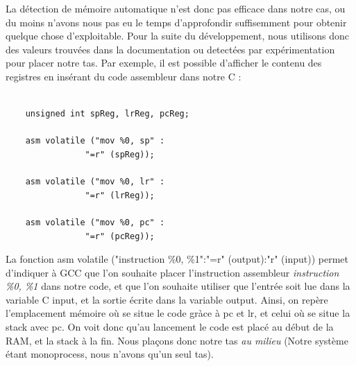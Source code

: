 \documentclass[frenchb]{article}
\begin{document}
La détection de mémoire automatique n'est donc pas efficace dans notre cas, ou du moins n'avons nous pas eu le temps d'approfondir suffisemment pour obtenir quelque chose d'exploitable. Pour la suite du développement, nous utilisons donc des valeurs trouvées dans la documentation ou detectées par expérimentation pour placer notre tas. Par exemple, il est possible d'afficher le contenu des registres en insérant du code assembleur dans notre C :
\begin{lstlisting}

    unsigned int spReg, lrReg, pcReg;

    asm volatile ("mov %0, sp" :
                "=r" (spReg));
    
    asm volatile ("mov %0, lr" :
                "=r" (lrReg));

    asm volatile ("mov %0, pc" :
                "=r" (pcReg));
\end{lstlisting}
La fonction \textsf{asm volatile ("instruction \%0, \%1":"=r" (output):"r" (input))} permet d'indiquer à GCC que l'on souhaite placer l'instruction assembleur \textit{instruction \%0, \%1} dans notre code, et que l'on souhaite utiliser que l'entrée soit lue dans la variable C input, et la sortie écrite dans la variable output. Ainsi, on repère l'emplacement mémoire où se situe le code gràce à pc et lr, et celui où se situe la stack avec pc. On voit donc qu'au lancement le code est placé au début de la RAM, et la stack à la fin. Nous plaçons donc notre tas \textit{au milieu} (Notre système étant monoprocess, nous n'avons qu'un seul tas).
\end{document}
